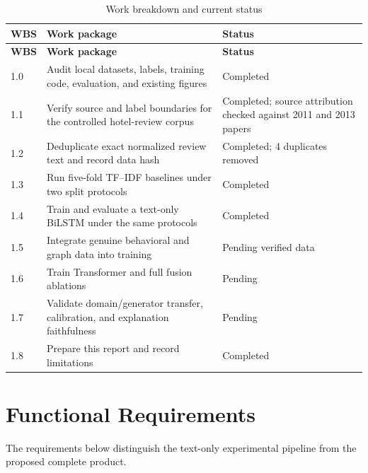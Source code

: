 \documentclass[12pt,a4paper]{report}
\begin{document}
\begin{longtable}{p{}p{}p{}}
\caption{Work breakdown and current status}\label{tab:wbs}\\
\toprule
\textbf{WBS} & \textbf{Work package} & \textbf{Status} \\
\midrule
\endfirsthead
\toprule
\textbf{WBS} & \textbf{Work package} & \textbf{Status} \\
\midrule
\endhead
1.0 & Audit local datasets, labels, training code, evaluation, and existing figures & Completed \\
1.1 & Verify source and label boundaries for the controlled hotel-review corpus & Completed; source attribution checked against 2011 and 2013 papers \\
1.2 & Deduplicate exact normalized review text and record data hash & Completed; 4 duplicates removed \\
1.3 & Run five-fold TF--IDF baselines under two split protocols & Completed \\
1.4 & Train and evaluate a text-only BiLSTM under the same protocols & Completed \\
1.5 & Integrate genuine behavioral and graph data into training & Pending verified data \\
1.6 & Train Transformer and full fusion ablations & Pending \\
1.7 & Validate domain/generator transfer, calibration, and explanation faithfulness & Pending \\
1.8 & Prepare this report and record limitations & Completed \\
\bottomrule
\end{longtable}

\section{Functional Requirements}

The requirements below distinguish the text-only experimental pipeline from the proposed complete product.
\end{document}
